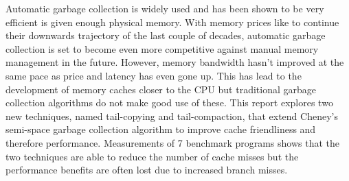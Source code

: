 Automatic garbage collection is widely used and has been shown to be very
efficient is given enough physical memory. With memory prices like to continue
their downwards trajectory of the last couple of decades, automatic garbage
collection is set to become even more competitive against manual memory management
in the future. However, memory bandwidth hasn't improved at the same pace as price
and latency has even gone up. This has lead to the development of memory caches
closer to the CPU but traditional garbage collection algorithms do not make good
use of these. This report explores two new techniques, named tail-copying and
tail-compaction, that extend Cheney's
semi-space garbage collection algorithm to improve cache friendliness and therefore
performance. Measurements of 7 benchmark programs shows that the two techniques
are able to reduce the number of cache misses but the performance benefits are
often lost due to increased branch misses.
